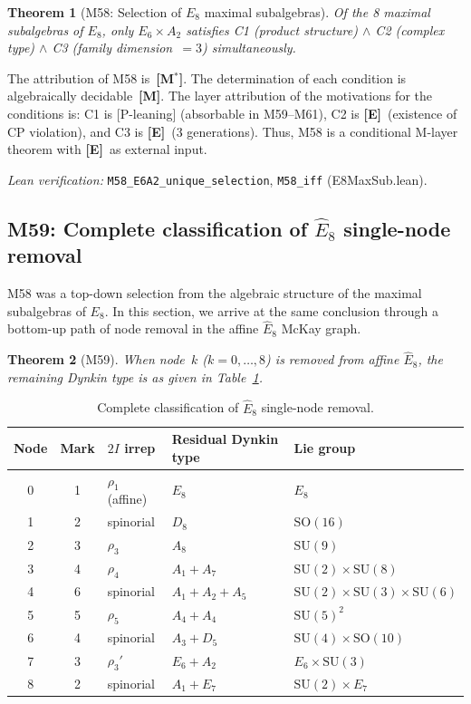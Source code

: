 \documentclass[sn-mathphys-num,Numbered]{sn-jnl}
\theoremstyle{thmstyleone}
\newtheorem{theorem}{Theorem}[section]
\theoremstyle{thmstylethree}
\newcommand{\SU}{\mathrm{SU}}
\newcommand{\SO}{\mathrm{SO}}
\newcommand{\Ehat}{\hat{E}}
\newcommand{\layerM}{\textbf{[M]}}
\newcommand{\layerE}{\textbf{[E]}}
\newcommand{\layerMs}{\textbf{[M$^*$]}}
\begin{document}
\begin{theorem}[M58: Selection of $E_8$ maximal subalgebras]\label{thm:M58}
Of the 8 maximal subalgebras of $E_8$, only $E_6 \times A_2$ satisfies C1
(product structure) $\wedge$ C2 (complex type) $\wedge$ C3 (family
dimension~$= 3$) simultaneously.
\end{theorem}

The attribution of M58 is~\layerMs.  The determination of each condition is
algebraically decidable~\layerM.  The layer attribution of the motivations
for the conditions is: C1 is [P-leaning] (absorbable in M59--M61), C2 is
\layerE\ (existence of CP violation), and C3 is \layerE\ (3 generations).
Thus, M58 is a conditional M-layer theorem with \layerE\ as external input.

\noindent\textit{Lean verification:}
\texttt{M58\_E6A2\_unique\_selection}, \texttt{M58\_iff} (E8MaxSub.lean).


\subsection{M59: Complete classification of $\Ehat_8$ single-node removal}\label{sec:M59}

M58 was a top-down selection from the algebraic structure of the maximal
subalgebras of $E_8$.  In this section, we arrive at the same conclusion
through a bottom-up path of node removal in the affine $\Ehat_8$ McKay graph.

\begin{theorem}[M59]\label{thm:M59}
When node~$k$ ($k = 0, \ldots, 8$) is removed from affine $\Ehat_8$, the
remaining Dynkin type is as given in Table~\ref{tab:M59}.
\end{theorem}

\begin{table}[htb]
\centering
\caption{Complete classification of $\Ehat_8$ single-node removal.}\label{tab:M59}
\begin{tabular}{cclll}
\toprule
Node & Mark & $2I$ irrep & Residual Dynkin type & Lie group \\
\midrule
0 & 1 & $\rho_1$ (affine) & $E_8$ & $E_8$ \\
1 & 2 & spinorial & $D_8$ & $\SO(16)$ \\
2 & 3 & $\rho_3$ & $A_8$ & $\SU(9)$ \\
3 & 4 & $\rho_4$ & $A_1 + A_7$ & $\SU(2) \times \SU(8)$ \\
4 & 6 & spinorial & $A_1 + A_2 + A_5$ & $\SU(2) \times \SU(3) \times \SU(6)$ \\
5 & 5 & $\rho_5$ & $A_4 + A_4$ & $\SU(5)^2$ \\
6 & 4 & spinorial & $A_3 + D_5$ & $\SU(4) \times \SO(10)$ \\
7 & 3 & $\rho_3'$ & $E_6 + A_2$ & $E_6 \times \SU(3)$ \\
8 & 2 & spinorial & $A_1 + E_7$ & $\SU(2) \times E_7$ \\
\bottomrule
\end{tabular}
\end{table}
\end{document}
